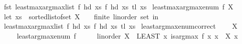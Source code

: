 \begin{isabellebody}
\ \ fst\ {\isacharparenleft}{\kern0pt}least{\isacharunderscore}{\kern0pt}max{\isacharunderscore}{\kern0pt}arg{\isacharunderscore}{\kern0pt}max{\isacharunderscore}{\kern0pt}list\ f\ {\isacharparenleft}{\kern0pt}hd\ xs{\isacharcomma}{\kern0pt}\ f\ {\isacharparenleft}{\kern0pt}hd\ xs{\isacharparenright}{\kern0pt}{\isacharparenright}{\kern0pt}\ {\isacharparenleft}{\kern0pt}tl\ xs{\isacharparenright}{\kern0pt}{\isacharparenright}{\kern0pt}{\isacharparenright}{\kern0pt}{\isachardoublequoteclose}\isanewline
\isanewline
{}\isamarkupfalse%
\ {\isachardoublequoteopen}least{\isacharunderscore}{\kern0pt}max{\isacharunderscore}{\kern0pt}arg{\isacharunderscore}{\kern0pt}max{\isacharunderscore}{\kern0pt}enum\ f\ X\ {\isacharequal}{\kern0pt}\ {\isacharparenleft}{\kern0pt}\isanewline
\ \ let\ xs\ {\isacharequal}{\kern0pt}\ sorted{\isacharunderscore}{\kern0pt}list{\isacharunderscore}{\kern0pt}of{\isacharunderscore}{\kern0pt}set\ {\isacharparenleft}{\kern0pt}X\ {\isacharcolon}{\kern0pt}{\isacharcolon}{\kern0pt}\ {\isacharparenleft}{\kern0pt}{\isacharunderscore}{\kern0pt}\ {\isacharcolon}{\kern0pt}{\isacharcolon}{\kern0pt}\ {\isacharbraceleft}{\kern0pt}finite{\isacharcomma}{\kern0pt}\ linorder{\isacharbraceright}{\kern0pt}{\isacharparenright}{\kern0pt}\ set{\isacharparenright}{\kern0pt}\ in\isanewline
\ \ {\isacharparenleft}{\kern0pt}least{\isacharunderscore}{\kern0pt}max{\isacharunderscore}{\kern0pt}arg{\isacharunderscore}{\kern0pt}max{\isacharunderscore}{\kern0pt}list\ f\ {\isacharparenleft}{\kern0pt}hd\ xs{\isacharcomma}{\kern0pt}\ f\ {\isacharparenleft}{\kern0pt}hd\ xs{\isacharparenright}{\kern0pt}{\isacharparenright}{\kern0pt}\ {\isacharparenleft}{\kern0pt}tl\ xs{\isacharparenright}{\kern0pt}{\isacharparenright}{\kern0pt}{\isacharparenright}{\kern0pt}{\isachardoublequoteclose}\isanewline
\isanewline
{}\isamarkupfalse%
\ least{\isacharunderscore}{\kern0pt}arg{\isacharunderscore}{\kern0pt}max{\isacharunderscore}{\kern0pt}enum{\isacharunderscore}{\kern0pt}correct{\isacharcolon}{\kern0pt}\ \isanewline
\ \ \ {\isachardoublequoteopen}X\ {\isasymnoteq}\ {\isacharbraceleft}{\kern0pt}{\isacharbraceright}{\kern0pt}{\isachardoublequoteclose}\isanewline
\ \ \ {\isachardoublequoteopen}\isanewline
\ \ {\isacharparenleft}{\kern0pt}least{\isacharunderscore}{\kern0pt}arg{\isacharunderscore}{\kern0pt}max{\isacharunderscore}{\kern0pt}enum\ {\isacharparenleft}{\kern0pt}f\ {\isacharcolon}{\kern0pt}{\isacharcolon}{\kern0pt}\ {\isacharunderscore}{\kern0pt}\ {\isasymRightarrow}\ {\isacharparenleft}{\kern0pt}{\isacharunderscore}{\kern0pt}\ {\isacharcolon}{\kern0pt}{\isacharcolon}{\kern0pt}\ linorder{\isacharparenright}{\kern0pt}{\isacharparenright}{\kern0pt}\ X{\isacharparenright}{\kern0pt}\ {\isacharequal}{\kern0pt}\ {\isacharparenleft}{\kern0pt}LEAST\ x{\isachardot}{\kern0pt}\ is{\isacharunderscore}{\kern0pt}arg{\isacharunderscore}{\kern0pt}max\ f\ {\isacharparenleft}{\kern0pt}{\isasymlambda}x{\isachardot}{\kern0pt}\ x\ {\isasymin}\ X{\isacharparenright}{\kern0pt}\ x{\isacharparenright}{\kern0pt}{\isachardoublequoteclose}\isanewline

\end{isabellebody}
